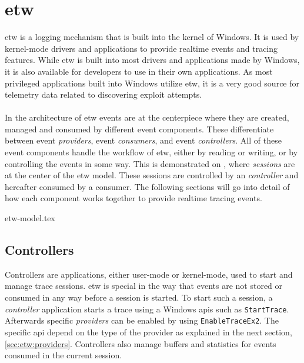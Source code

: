 \documentclass{report}
\begin{document}
\section{\acrfull{etw}}
\label{cha:etw}
\gls{etw} is a logging mechanism that is built into the kernel of Windows. It is used by kernel-mode drivers and applications to provide realtime events and tracing features. While \gls{etw} is built into most drivers and applications made by Windows, it is also available for developers to use in their own applications. As most privileged applications built into Windows utilize \gls{etw}, it is a very good source for telemetry data related to discovering exploit attempts.
\\
\\
In the architecture of \gls{etw} events are at the centerpiece where they are created, managed and consumed by different event components\cite{url:etw:about}. These differentiate between event \emph{providers}, event \emph{consumers}, and event \emph{controllers}. All of these event components handle the workflow of \gls{etw}, either by reading or writing, or by controlling the events in some way. This is demonstrated on , where \emph{sessions} are at the center of the \gls{etw} model. These sessions are controlled by an \emph{controller} and hereafter consumed by a consumer. The following sections will go into detail of how each component works together to provide realtime tracing events.

{etw-model.tex}

\subsection{Controllers}
Controllers are applications, either user-mode or kernel-mode, used to start and manage trace sessions. \gls{etw} is special in the way that events are not stored or consumed in any way before a session is started. To start such a session, a \emph{controller} application starts a trace using a Windows \gls{api}s such as \texttt{StartTrace}. Afterwards specific \emph{providers} can be enabled by using \texttt{EnableTraceEx2}. The specific \gls{api} depend on the type of the provider as explained in the next section, \ref{sec:etw:providers}. Controllers also manage buffers and statistics for events consumed in the current session.
\end{document}
